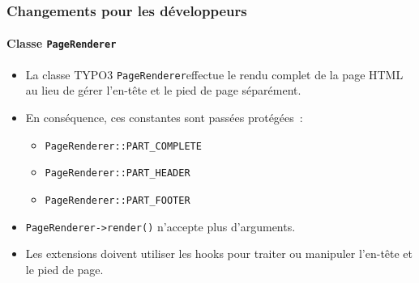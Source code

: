 %

\begin{frame}[fragile]
	\frametitle{Changements pour les développeurs}
	\framesubtitle{Classe \texttt{PageRenderer}}

	\begin{itemize}
		\item La classe TYPO3 \small\texttt{PageRenderer}\normalsize effectue
			le rendu complet de la page HTML au lieu de gérer l'en-tête et
			le pied de page séparément.

		\item En conséquence, ces constantes sont passées protégées~:

			\begin{itemize}\small
				\item \texttt{PageRenderer::PART\_COMPLETE}
				\item \texttt{PageRenderer::PART\_HEADER}
				\item \texttt{PageRenderer::PART\_FOOTER}
			\end{itemize}

		\item \texttt{PageRenderer->render()} n'accepte plus d'arguments.

		\item Les extensions doivent utiliser les hooks pour traiter ou manipuler
			l'en-tête et le pied de page.

	\end{itemize}
\end{frame}

